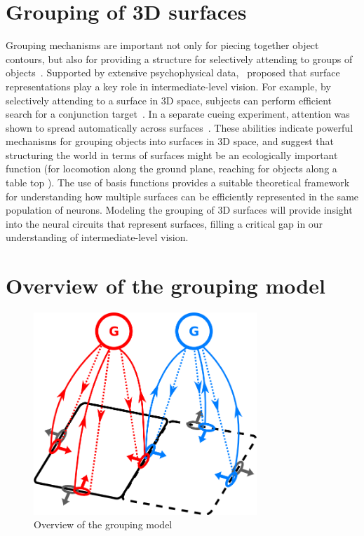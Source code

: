 \section{Grouping of 3D surfaces}
Grouping mechanisms are important not only for piecing together object contours, but also for providing a structure for selectively attending
to groups of objects~\citep{Treisman_Gelade80}. Supported by extensive psychophysical data,~\citet*{Nakayama_etal95} proposed that surface
representations play a key role in intermediate-level vision. For example, by selectively attending to a surface in 3D space, subjects can perform efficient search for a conjunction target~\citep{Nakayama_Silverman86}. In a separate cueing experiment, attention was shown to spread automatically across surfaces~\citep{He_Nakayama95}. These abilities indicate powerful mechanisms for grouping objects into surfaces in 3D space, and suggest that structuring the world in terms of surfaces might be an ecologically important function (\eg for locomotion along the ground
plane, reaching for objects along a table top \etc). The use of basis functions provides a suitable theoretical framework for understanding how multiple surfaces can be efficiently represented in the same population of neurons. Modeling the grouping of 3D surfaces will provide insight into the neural circuits that represent surfaces, filling a critical gap in our understanding of intermediate-level vision.

\section{Overview of the grouping model}

\begin{figure}[t]
\centering
\includegraphics[width=0.75\textwidth]{Intro/figs/groupingcircuit}
\makeatletter
\let\@currsize\normalsize
\caption{Overview of the grouping model}
\label{fig:GroupingModel}
\end{figure}

